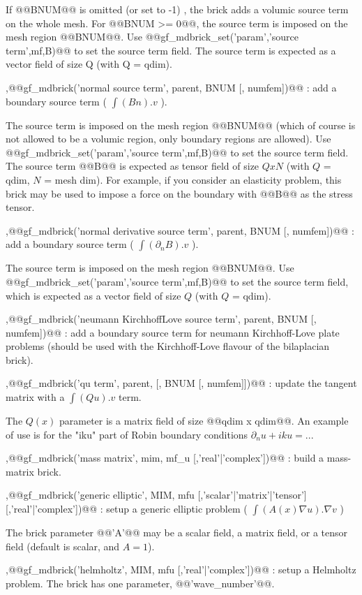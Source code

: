 \begin{cmddescription}
If @@BNUM@@ is omitted (or set to -1) , the brick adds a volumic
source term on the whole mesh. For @@BNUM >= 0@@, the source term is
imposed on the mesh region @@BNUM@@. Use @@gf_mdbrick_set('param','source
term',mf,B)@@ to set the source term field. The source term is
expected as a vector field of size Q (with Q = qdim).

\sep{@@gf_mdbrick('normal source term', parent, BNUM [, numfem])@@}
 : add a boundary source term ( $\int (Bn).v$ ).

The source term is imposed on the mesh region @@BNUM@@ (which of
course is not allowed to be a volumic region, only boundary
regions are allowed). Use @@gf_mdbrick_set('param','source term',mf,B)@@
to set the source term field. The source term @@B@@ is expected as
tensor field of size $QxN$ (with $Q$ = qdim, $N$ = mesh dim). For
example, if you consider an elasticity problem, this brick may
be used to impose a force on the boundary with @@B@@ as the stress
tensor.

\sep{@@gf_mdbrick('normal derivative source term', parent, BNUM [, numfem])@@}
 : add a boundary source term ( $\int (\partial_n B).v$ ).

The source term is imposed on the mesh region @@BNUM@@.  Use
@@gf_mdbrick_set('param','source term',mf,B)@@ to set the source term
field, which is expected as a vector field of size $Q$ (with $Q$ =
qdim).

\sep{@@gf_mdbrick('neumann KirchhoffLove source term', parent, BNUM [, numfem])@@} : add a boundary source term for neumann Kirchhoff-Love
plate problems (should be used with the Kirchhoff-Love flavour of the
bilaplacian brick).

\sep{@@gf_mdbrick('qu term', parent, [, BNUM [, numfem]])@@}
 : update the tangent matrix with a $\int (Qu).v$ term.

The $Q(x)$ parameter is a matrix field of size @@qdim x qdim@@. An
example of use is for the "iku" part of Robin boundary conditions
$\partial_n u + iku = ...$

\sep{@@gf_mdbrick('mass matrix', mim, mf_u [,'real'|'complex'])@@}
 : build a mass-matrix brick.

\sep{@@gf_mdbrick('generic elliptic', MIM, mfu [,'scalar'|'matrix'|'tensor'][,'real'|'complex'])@@}
 : setup a generic elliptic problem ( $\int (A(x)\nabla u).\nabla v$ )

The brick parameter @@'A'@@ may be a scalar field, a matrix field, or a tensor field (default is scalar, and $A=1$).

\sep{@@gf_mdbrick('helmholtz', MIM, mfu [,'real'|'complex'])@@}
 : setup a Helmholtz problem. The brick has one parameter, @@'wave_number'@@.


\end{cmddescription}
